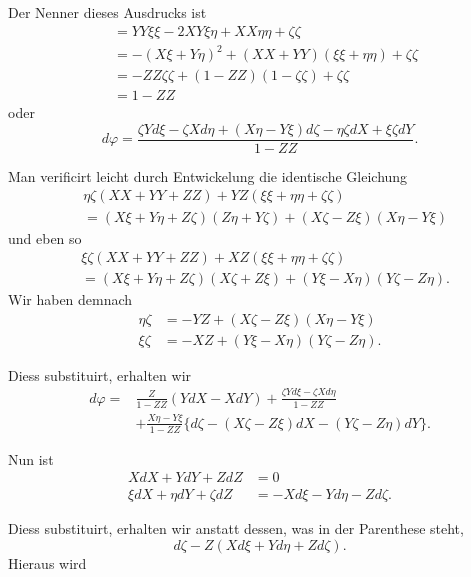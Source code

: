 %
Der Nenner dieses Ausdrucks ist
\[
\begin{aligned}
&=YY\xi\xi-2XY\xi\eta+XX\eta\eta+\zeta\zeta\\
&=-(X\xi+Y\eta)^{2}+(XX+YY)(\xi\xi+\eta\eta)+\zeta\zeta\\
&=-ZZ\zeta\zeta+(1-ZZ)(1-\zeta\zeta)+\zeta\zeta\\
&=1-ZZ
\end{aligned}
\]
oder
\[
d\varphi=\frac{\zeta Yd\xi-\zeta Xd\eta+(X\eta-Y\xi)d\zeta-\eta\zeta dX+\xi\zeta dY}{1-ZZ}.
\]

Man verificirt leicht durch Entwickelung die identische Gleichung
\[
\begin{aligned}
&\eta\zeta(XX+YY+ZZ)+YZ(\xi\xi+\eta\eta+\zeta\zeta)\\
&=(X\xi+Y\eta+Z\zeta)(Z\eta+Y\zeta)+(X\zeta-Z\xi)(X\eta-Y\xi)
\end{aligned}
\]
und eben so
\[
\begin{aligned}
&\xi\zeta(XX+YY+ZZ)+XZ(\xi\xi+\eta\eta+\zeta\zeta)\\
&=(X\xi+Y\eta+Z\zeta)(X\zeta+Z\xi)+(Y\xi-X\eta)(Y\zeta-Z\eta).
\end{aligned}
\]
Wir haben demnach
\[
\begin{aligned}
\eta\zeta&=-YZ+(X\zeta-Z\xi)(X\eta-Y\xi)\\
\xi\zeta&=-XZ+(Y\xi-X\eta)(Y\zeta-Z\eta).
\end{aligned}
\]

Diess substituirt, erhalten wir
\[
\begin{aligned}
d\varphi={}&\frac{Z}{1-ZZ}(YdX-XdY)+\frac{\zeta Yd\xi-\zeta Xd\eta}{1-ZZ}\\
&+\frac{X\eta-Y\xi}{1-ZZ}\{d\zeta-(X\zeta-Z\xi)dX-(Y\zeta-Z\eta)dY\}.
\end{aligned}
\]

Nun ist
\[
\begin{aligned}
XdX+YdY+ZdZ&=0\\
\xi dX+\eta dY+\zeta dZ&=-Xd\xi-Yd\eta-Zd\zeta.
\end{aligned}
\]

Diess substituirt, erhalten wir anstatt dessen, was in der Parenthese steht,
\[
d\zeta-Z(Xd\xi+Yd\eta+Zd\zeta).
\]
Hieraus wird
